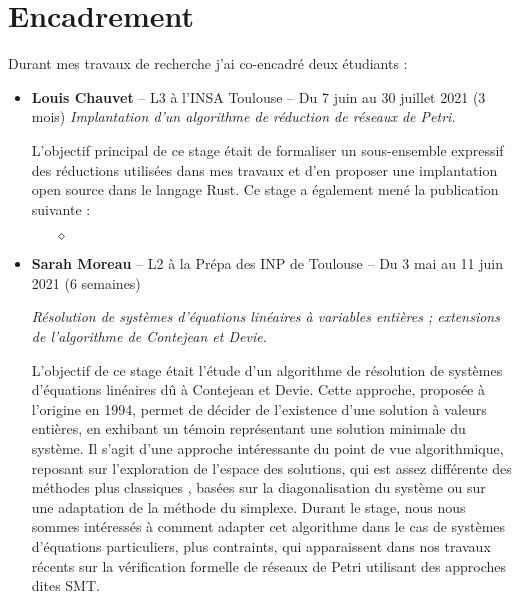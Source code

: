 \begin{mdframed}
\end{mdframed}



\vspace{10pt}
\section{Encadrement}
\vspace{10pt}

Durant mes travaux de recherche j'ai co-encadré deux étudiants :

\begin{itemize}
  \item \textbf{Louis Chauvet} -- L3 à l'INSA Toulouse -- Du 7 juin au 30 juillet 2021 (3 mois)
  \smallbreak
  \textit{Implantation d'un algorithme de réduction de réseaux de Petri.}
  \begin{mdframed}
    L'objectif principal de ce stage était de formaliser un sous-ensemble
    expressif des réductions utilisées dans mes travaux et d'en proposer une
    implantation open source dans le langage
    Rust. Ce stage a également mené
    la publication suivante :
    \begin{itemize}
      \item[$\diamond$] 
    \end{itemize}
  \end{mdframed}
  \newpage
  \item \textbf{Sarah Moreau} -- L2 à la Prépa des INP de Toulouse -- Du 3 mai au 11 juin 2021 (6 semaines)
  
  \smallbreak
  \textit{Résolution de systèmes d'équations linéaires à variables entières ; extensions de l'algorithme de Contejean et Devie.}
  \begin{mdframed}
    L'objectif de ce stage était l'étude d'un algorithme de résolution de systèmes
    d'équations linéaires dû à Contejean et Devie. Cette approche, proposée à
    l'origine en 1994, permet de décider de l'existence d'une solution à valeurs
    entières, en exhibant un témoin représentant une solution minimale du système.
    Il s'agit d'une approche intéressante du point de vue algorithmique, reposant
    sur l'exploration de l'espace des solutions, qui est assez différente des
    méthodes \og plus classiques \fg, basées sur la diagonalisation du système ou sur
    une adaptation de la méthode du simplexe. Durant le stage, nous nous sommes
    intéressés à comment adapter cet algorithme dans le cas de systèmes
    d'équations particuliers, plus contraints, qui apparaissent dans nos travaux
    récents sur la vérification formelle de réseaux de Petri utilisant des
    approches dites SMT. 
  \end{mdframed}
\end{itemize}









